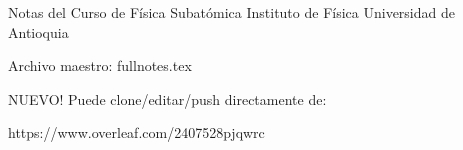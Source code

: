 Notas del Curso de Física Subatómica
Instituto de Física 
Universidad de Antioquia

Archivo maestro: fullnotes.tex

NUEVO!
Puede clone/editar/push directamente de:

https://www.overleaf.com/2407528pjqwrc